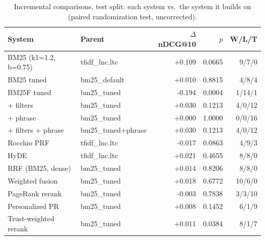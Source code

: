 \begin{table}[t]
\centering
\small
\begin{tabular}{llrrr}
\toprule
System & Parent & $\Delta$nDCG@10 & $p$ & W/L/T \\
\midrule
BM25 (k1=1.2, b=0.75) & tfidf\_lnc.ltc & +0.109 & 0.0665 & 9/7/0 \\
BM25 tuned & bm25\_default & +0.010 & 0.8815 & 4/8/4 \\
BM25F tuned & bm25\_tuned & -0.194 & 0.0004 & 1/14/1 \\
+ filters & bm25\_tuned & +0.030 & 0.1213 & 4/0/12 \\
+ phrase & bm25\_tuned & +0.000 & 1.0000 & 0/0/16 \\
+ filters + phrase & bm25\_tuned+phrase & +0.030 & 0.1213 & 4/0/12 \\
Rocchio PRF & tfidf\_lnc.ltc & -0.017 & 0.0863 & 4/9/3 \\
HyDE & tfidf\_lnc.ltc & +0.021 & 0.4655 & 8/8/0 \\
RRF (BM25, dense) & bm25\_tuned & +0.014 & 0.8206 & 8/8/0 \\
Weighted fusion & bm25\_tuned & +0.018 & 0.6772 & 10/6/0 \\
PageRank rerank & bm25\_tuned & -0.003 & 0.7838 & 3/3/10 \\
Personalized PR & bm25\_tuned & +0.008 & 0.1452 & 6/1/9 \\
Trust-weighted rerank & bm25\_tuned & +0.011 & 0.0384 & 8/1/7 \\
\bottomrule
\end{tabular}
\caption{Incremental comparisons, test split: each system vs.\ the system it builds on (paired randomization test, uncorrected).}
\label{tab:ablation-incremental-test}
\end{table}

